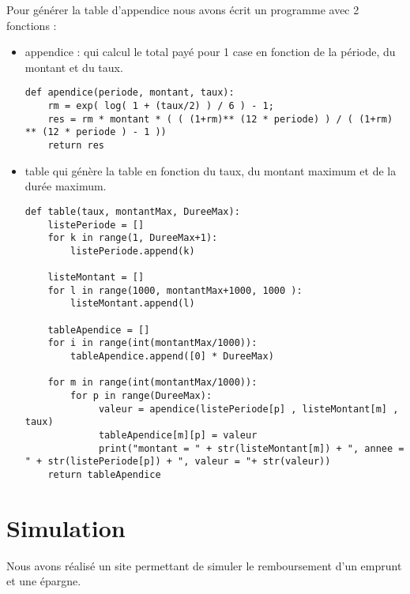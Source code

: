 \documentclass[12pt]{article}
\begin{document}
Pour générer la table d'appendice nous avons écrit un programme avec 2 fonctions :  
\begin{itemize}[label=$\bullet$]
\item appendice : qui calcul le total payé pour 1 case en fonction de la période, du montant et du taux.
\begin{lstlisting}
def apendice(periode, montant, taux):
    rm = exp( log( 1 + (taux/2) ) / 6 ) - 1;
    res = rm * montant * ( ( (1+rm)** (12 * periode) ) / ( (1+rm) ** (12 * periode ) - 1 ))
    return res
\end{lstlisting}
\item table qui génère la table en fonction du taux, du montant maximum et de la durée maximum.
\begin{lstlisting}
def table(taux, montantMax, DureeMax):
    listePeriode = []
    for k in range(1, DureeMax+1):
        listePeriode.append(k)
    
    listeMontant = []
    for l in range(1000, montantMax+1000, 1000 ):
        listeMontant.append(l)
        
    tableApendice = []
    for i in range(int(montantMax/1000)):
        tableApendice.append([0] * DureeMax)
        
    for m in range(int(montantMax/1000)):
        for p in range(DureeMax):
             valeur = apendice(listePeriode[p] , listeMontant[m] , taux)
             tableApendice[m][p] = valeur
             print("montant = " + str(listeMontant[m]) + ", annee = " + str(listePeriode[p]) + ", valeur = "+ str(valeur))
    return tableApendice
\end{lstlisting}
\end{itemize}
\newpage
\section{Simulation}
Nous avons réalisé un site permettant de simuler le remboursement d'un emprunt et une épargne.
\end{document}

